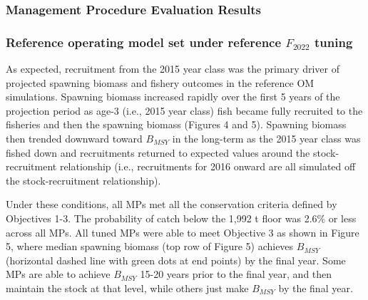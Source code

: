 \documentclass[11pt]{book}
\begin{document}
\hypertarget{management-procedure-evaluation-results}{%
\subsubsection{Management Procedure Evaluation Results}\label{management-procedure-evaluation-results}}

\hypertarget{reference-operating-model-set-under-reference-f_2022-tuning}{%
\subsubsection{\texorpdfstring{Reference operating model set under reference \(F_{2022}\) tuning}{Reference operating model set under reference F\_\{2022\} tuning}}\label{reference-operating-model-set-under-reference-f_2022-tuning}}

As expected, recruitment from the 2015 year class was the primary driver of projected spawning biomass and fishery outcomes in the reference OM simulations. Spawning biomass increased rapidly over the first 5 years of the projection period as age-3 (i.e., 2015 year class) fish became fully recruited to the fisheries and then the spawning biomass (Figures 4 and 5). Spawning biomass then trended downward toward \(B_{MSY}\) in the long-term as the 2015 year class was fished down and recruitments returned to expected values around the stock-recruitment relationship (i.e., recruitments for 2016 onward are all simulated off the stock-recruitment relationship).

Under these conditions, all MPs met all the conservation criteria defined by Objectives 1-3. The probability of catch below the 1,992 t floor was 2.6\% or less across all MPs. All tuned MPs were able to meet Objective 3 as shown in Figure 5, where median spawning biomass (top row of Figure 5) achieves \(B_{MSY}\) (horizontal dashed line with green dots at end points) by the final year. Some MPs are able to achieve \(B_{MSY}\) 15-20 years prior to the final year, and then maintain the stock at that level, while others just make \(B_{MSY}\) by the final year.
\end{document}
